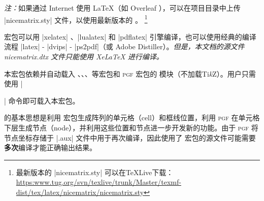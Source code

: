 \documentclass[dvipsnames]{article}%
\def\tikzname{Ti\emph{k}Z}
\begin{document}
\bigskip
\emph{注：}如果通过 Internet 使用 LaTeX（如 Overleaf ），可以在项目目录中上传 |nicematrix.sty| 文件，以使用最新版本的  。
\footnote{最新版本的 |nicematrix.sty| 可以在TeXLive下载：\newline
  \small
  \url{https:www.tug.org/svn/texlive/trunk/Master/texmf-dist/tex/latex/nicematrix/nicematrix.sty}}

\bigskip
宏包可以用 |xelatex| 、|lualatex| 和 |pdflatex| 引擎编译，也可以使用经典的编译流程 |latex| - |dvips| - |ps2pdf|（或 Adobe Distiller）。\textsl{但是，本文档的源文件 nicematrix.dtx 文件只能使用 XeLaTeX 进行编译。}

\bigskip
本宏包依赖并自动载入  、、、等宏包和 \textsc{pgf} 宏包的  模块（不加载\tikzname）。用户只需使用 |\usepackage{nicematrix}| 命令即可载入本宏包。

\bigskip
 的基本思想是利用  宏包生成阵列的单元格（cell）和框线位置，利用 \textsc{pgf} 在单元格下层生成节点（node），并利用这些位置和节点进一步开发新的功能。由于 \textsc{pgf} 将节点坐标存储于 |.aux| 文件中用于再次编译，因此使用了  宏包的源文件可能需要\textbf{多次}编译才能正确输出结果。
\end{document}
